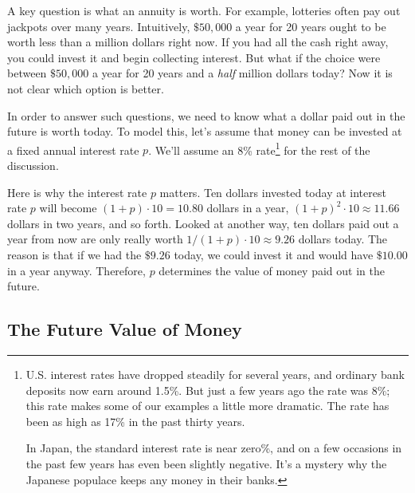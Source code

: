A key question is what an annuity is worth.  For example, lotteries often
pay out jackpots over many years.  Intuitively, $\$50,000$ a year for 20
years ought to be worth less than a million dollars right now.  If you had
all the cash right away, you could invest it and begin collecting
interest.  But what if the choice were between $\$50,000$ a year for 20
years and a \emph{half} million dollars today?  Now it is not clear which
option is better.

In order to answer such questions, we need to know what a dollar paid out
in the future is worth today.  To model this, let's assume that money can
be invested at a fixed annual interest rate $p$.  We'll assume an 8\%
rate\footnote{U.S. interest rates have dropped steadily for several years,
  and ordinary bank deposits now earn around 1.5\%.  But just a few years
  ago the rate was 8\%; this rate makes some of our examples a little more
  dramatic.  The rate has been as high as 17\% in the past thirty
  years.

  In Japan, the standard interest rate is near zero\%, and on a few
  occasions in the past few years has even been slightly negative.  It's a
  mystery why the Japanese populace keeps any money in their banks.}  for
the rest of the discussion.

Here is why the interest rate $p$ matters.  Ten dollars invested today
at interest rate $p$ will become $(1+p)\cdot 10 = 10.80$ dollars in a
year, $(1+p)^2\cdot 10 \approx 11.66$ dollars in two years, and so
forth.  Looked at another way, ten dollars paid out a year from now
are only really worth $1/(1+p) \cdot 10 \approx 9.26$ dollars today.
The reason is that if we had the $\$9.26$ today, we could invest it
and would have $\$10.00$ in a year anyway.  Therefore, $p$ determines
the value of money paid out in the future. 

\subsection{The Future Value of Money}

